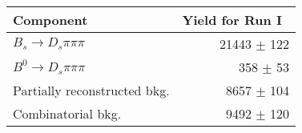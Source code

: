  \begin{tabular}{l r }
\hline\hline
Component & Yield for Run I\ \\
\hline
$B_s \to D_s \pi \pi \pi$ & 21443 $\pm$ 122 \\
$B^{0} \to D_s \pi \pi \pi$ & 358 $\pm$ 53 \\
Partially reconstructed bkg. & 8657 $\pm$ 104 \\
Combinatorial bkg. & 9492 $\pm$ 120 \\
\hline\hline
\end{tabular}
\label{table:normYields_run1}
